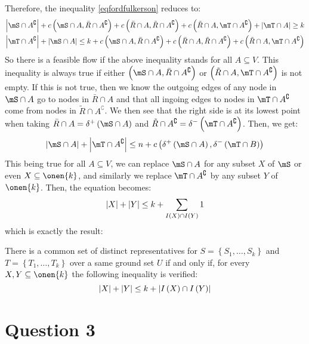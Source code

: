 \documentclass[math]{cours}
\def\bR{\bar{R}}
\def\tR{\tilde{R}}
\def\Ac{A^{\complement}}
\begin{document}
Therefore, the inequality \ref{eqfordfulkerson} reduces to:
\begin{align*}
	\abs{\mS \cap \Ac} + c\left(\mS\cap A, \bR\cap \Ac \right) + c\left(\bR\cap A, \tR\cap \Ac \right) + c\left( \tR\cap A, \mT\cap \Ac \right) + \abs{\mT \cap A} \geq k\\
	\abs{\mT \cap \Ac} + \abs{\mS\cap A} \leq k + c\left(\mS \cap A, \bR\cap\Ac \right) + c\left(\bR \cap A, \tR\cap \Ac \right) + c\left(\tR\cap A, \mT\cap\Ac \right)
\end{align*}
So there is a feasible flow if the above inequality stands for all $A \subseteq V$.
This inequality is always true if either $\left(\mS\cap A, \bR\cap \Ac \right)$ or $\left(\tR\cap A, \mT\cap \Ac \right)$ is not empty.
If this is not true, then we know the outgoing edges of any node in $\mS \cap A$ go to nodes in $\bR \cap A$ and that all ingoing edges to nodes in $\mT\cap \Ac$ come from nodes in $\tR\cap\Ac$.
We then see that the right side is at its lowest point when taking $\bR \cap A = \delta^{+}\left(\mS \cap A\right)$ and $\tR\cap \Ac = \delta^{-}\left( \mT\cap \Ac \right)$.
Then, we get:
\begin{equation*}
	\abs{\mS \cap A} + \abs{\mT\cap \Ac} \leq n + c\left(\delta^{+}\left(\mS\cap A \right), \delta^{-}\left( \mT\cap B \right) \right)
\end{equation*}
This being true for all $A \subseteq V$, we can replace $\mS\cap A$ for any subset $X$ of $\mS$ or even $X \subseteq \onen{k}$, and similarly we replace $\mT\cap \Ac$ by any subset $Y$ of $\onen{k}$.
Then, the equation becomes:
\begin{equation*}
	\left|X\right| + \left|Y\right| \leq k + \sum_{I\left(X\right) \cap I\left(Y\right)} 1
\end{equation*}
which is exactly the result:
\begin{thm}
There is a common set of distinct representatives for $S = \left\{S_{1}, \ldots, S_{k} \right\}$ and $T = \left\{T_{1}, \ldots, T_{k} \right\}$ over a same ground set $U$ if and only if, for every $X, Y \subseteq \onen{k}$ the following inequality is verified:
\begin{equation*}
	\left|X\right| + \left|Y\right| \leq k + \left|I\left(X\right) \cap I\left(Y\right)\right|
\end{equation*}
\end{thm}

\section{Question 3}
\end{document}
